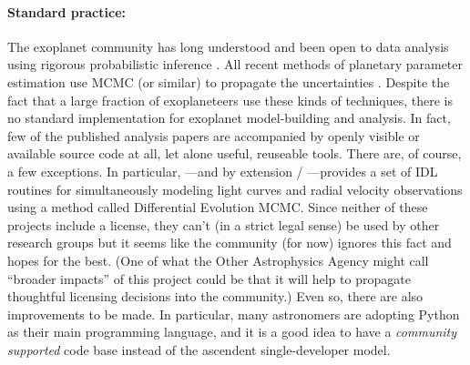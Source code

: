 \documentclass[letterpaper,12pt,preprint]{hack_aastex}
\begin{document}
\paragraph{Standard practice:}
The exoplanet community has long understood and been open to data analysis
using rigorous probabilistic inference \citep[for example,][]{ford}.
All recent methods of planetary parameter estimation use MCMC (or similar) to
propagate the uncertainties \citep[][to name only a few]{barclay,dressing,%
kepler5,kepler4}.
Despite the fact that a large fraction of exoplaneteers use these kinds of techniques, there is no standard
implementation for exoplanet model-building and analysis.
In fact, few of the published analysis papers are accompanied by openly visible or available source code at all, let alone useful, reuseable tools.
There are, of course, a few exceptions.
In particular,  \citep{exofast}---and by extension
/ \citep{autokep}---provides a set of IDL
routines for simultaneously modeling light curves and radial velocity
observations using a method called Differential Evolution MCMC.\@
Since neither of these projects include a license, they can't (in a strict legal sense) be used
by other research groups but it seems like the community (for now) ignores this fact and
hopes for the best.
(One of what the Other Astrophysics Agency might call ``broader impacts'' of this project could be that it will help to propagate thoughtful licensing decisions into the community.)
Even so, there are also improvements to be made.
In particular, many astronomers are adopting Python as their main programming
language, and it is a good idea to have a \emph{community supported} code
base instead of the ascendent single-developer model.
\end{document}
